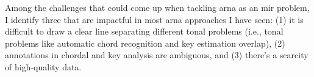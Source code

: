 

Among the challenges that could come up when tackling
\gls{arna} as an \gls{mir} problem, I identify three that
are impactful in most \gls{arna} approaches I have seen: (1)
it is difficult to draw a clear line separating different
tonal problems (i.e., tonal problems like automatic chord
recognition and key estimation overlap), (2) annotations in
chordal and key analysis are ambiguous, and (3) there's a
scarcity of high-quality data.
